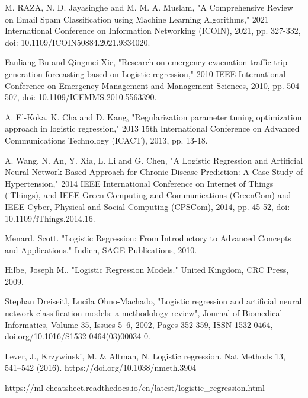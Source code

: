 \documentclass[conference]{IEEEtran}
\begin{document}



\begin{thebibliography}{00}

 M. RAZA, N. D. Jayasinghe and M. M. A. Muslam, "A Comprehensive Review on Email Spam Classification using Machine Learning Algorithms," 2021 International Conference on Information Networking (ICOIN), 2021, pp. 327-332, doi: 10.1109/ICOIN50884.2021.9334020.

 Fanliang Bu and Qingmei Xie, "Research on emergency evacuation traffic trip generation forecasting based on Logistic regression," 2010 IEEE International Conference on Emergency Management and Management Sciences, 2010, pp. 504-507, doi: 10.1109/ICEMMS.2010.5563390.

 A. El-Koka, K. Cha and D. Kang, "Regularization parameter tuning optimization approach in logistic regression," 2013 15th International Conference on Advanced Communications Technology (ICACT), 2013, pp. 13-18.

 A. Wang, N. An, Y. Xia, L. Li and G. Chen, "A Logistic Regression and Artificial Neural Network-Based Approach for Chronic Disease Prediction: A Case Study of Hypertension," 2014 IEEE International Conference on Internet of Things (iThings), and IEEE Green Computing and Communications (GreenCom) and IEEE Cyber, Physical and Social Computing (CPSCom), 2014, pp. 45-52, doi: 10.1109/iThings.2014.16.

 Menard, Scott. "Logistic Regression: From Introductory to Advanced Concepts and Applications." Indien, SAGE Publications, 2010.

 Hilbe, Joseph M.. "Logistic Regression Models." United Kingdom, CRC Press, 2009.

 Stephan Dreiseitl, Lucila Ohno-Machado, "Logistic regression and artificial neural network classification models: a methodology review", Journal of Biomedical Informatics, Volume 35, Issues 5–6, 2002, Pages 352-359, ISSN 1532-0464, doi.org/10.1016/S1532-0464(03)00034-0.

 Lever, J., Krzywinski, M. \& Altman, N. Logistic regression. Nat Methods 13, 541–542 (2016). https://doi.org/10.1038/nmeth.3904

 https://ml-cheatsheet.readthedocs.io/en/latest/logistic\_regression.html


\end{thebibliography}
\end{document}
